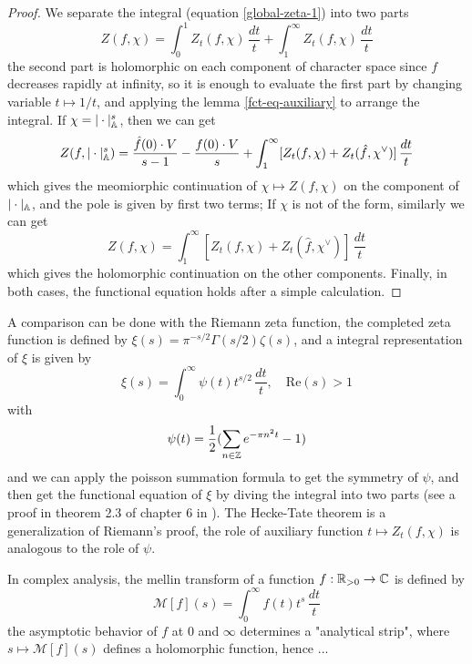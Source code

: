 \begin{proof}
    We separate the integral (equation \ref{global-zeta-1}) into two parts
    \begin{equation}
        Z(f,\chi) = \int_0^1 Z_t(f,\chi) \, \frac{dt}{t} + \int_1^\infty Z_t(f,\chi) \, \frac{dt}{t}
    \end{equation}
    the second part is holomorphic on each component of character space since \(f\) decreases rapidly at infinity, so it is enough to evaluate the first part by changing variable \(t \mapsto 1/t\), and applying the lemma \ref{fct-eq-auxiliary} to arrange the integral. If \(\chi = |\cdot|_{\mathbb{A}}^s\), then we can get
    \[Z(f,|\cdot|_{\mathbb{A}}^s) = \frac{\hat{f}(0) \cdot V}{s-1} - \frac{f(0)\cdot V}{s} +\int_1^\infty [Z_t(f,\chi) + Z_{t}(\hat{f},\chi^\vee)] \, \frac{dt}{t}\]
    which gives the meomiorphic continuation of \(\chi \mapsto Z(f,\chi)\) on the component of \(|\cdot|_{\mathbb{A}}\), and the pole is given by first two terms; If \(\chi\) is not of the form, similarly we can get
    \[Z(f,\chi) = \int_{1}^\infty [Z_t(f,\chi) + Z_{t}(\hat{f},\chi^\vee)] \, \frac{dt}{t}\]
    which gives the holomorphic continuation on the other components. Finally, in both cases, the functional equation holds after a simple calculation.
\end{proof}

\begin{remark}
    A comparison can be done with the Riemann zeta function, the completed zeta function is defined by \(\xi(s) = \pi^{-s/2}\Gamma(s/2)\zeta(s)\), and a integral representation of \(\xi\) is given by
    \[\xi(s) = \int_0^\infty \psi(t) t^{s/2} \, \frac{dt}{t}, \quad \mathrm{Re}(s) >1\]
    with
    \[\psi(t) = \frac{1}{2} (\sum_{n \in \mathbb{Z}}e^{-\pi n^2 t} - 1) \]
    and we can apply the poisson summation formula to get the symmetry of \(\psi\), and then get the functional equation of \(\xi\) by diving the integral into two parts (see a proof in theorem 2.3 of chapter 6 in \cite{stein2010complex}). The Hecke-Tate theorem is a generalization of Riemann's proof, the role of auxiliary function \(t \mapsto Z_t(f,\chi)\) is analogous to the role of \(\psi\).
\end{remark}

In complex analysis, the mellin transform of a function \(f: \mathbb{R}_{>0} \to \mathbb{C}\) is defined by
\[\mathcal{M}[f](s) = \int_{0}^\infty f(t) t^{s} \, \frac{dt}{t}\]
the asymptotic behavior of \(f\) at \(0\) and \(\infty\) determines a "analytical strip", where \(s \mapsto \mathcal{M}[f](s)\) defines a holomorphic function, hence ...

